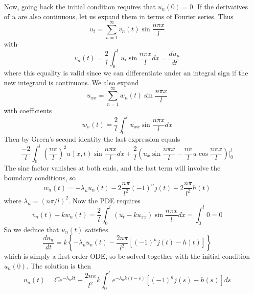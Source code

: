 \documentclass[12pt, a4paper, oneside, openright, titlepage]{book}
\begin{document}
Now, going back the initial condition requires that $u_n(0) = 0$. If the derivatives of $u$ are also continuous, let us expand them in terms of Fourier series. Thus \begin{equation*}
    u_t = \sum_{n=1}^{\infty}v_n(t)\sin\frac{n\pi x}{l}
\end{equation*}
with \begin{equation*}
    v_n(t) = \frac{2}{l}\int_0^lu_t\sin\frac{n\pi x}{l}dx = \frac{du_n}{dt}
\end{equation*}
where this equality is valid since we can differentiate under an integral sign if the new integrand is continuous. We also expand \begin{equation*}
    u_{xx} = \sum_{n=1}^{\infty}w_n(t)\sin\frac{n\pi x}{l}
\end{equation*}
with coefficients \begin{equation*}
    w_n(t) = \frac{2}{l}\int_0^lu_{xx}\sin\frac{n\pi x}{l}dx
\end{equation*}
Then by Green's second identity the last expression equals \begin{equation*}
    \frac{-2}{l}\int_0^l\left(\frac{n\pi}{l}\right)^2u(x,t)\sin\frac{n\pi x}{l}dx + \frac{2}{l}\left(u_x\sin\frac{n\pi x}{l} - \frac{n\pi}{l}u\cos\frac{n\pi x}{l}\right)\Bigg\rvert_0^l
\end{equation*}
The sine factor vanishes at both ends, and the last term will involve the boundary conditions, so \begin{equation*}
    w_n(t) = -\lambda_nu_n(t) - 2\frac{n\pi}{l^2}(-1)^nj(t) + 2\frac{n\pi}{l^2}h(t)
\end{equation*}
where $\lambda_n = (n\pi/l)^2$. Now the PDE requires \begin{equation*}
    v_n(t) - kw_n(t) = \frac{2}{l}\int_0^l(u_t - ku_{xx})\sin\frac{n\pi x}{l}dx = \int_0^l0 = 0
\end{equation*}
So we deduce that $u_n(t)$ satisfies \begin{equation*}
    \frac{du_n}{dt} = k\left\{-\lambda_nu_n(t) - \frac{2n\pi}{l^2}\left[(-1)^nj(t) - h(t)\right]\right\}
\end{equation*}
which is simply a first order ODE, so be solved together with the initial condition $u_n(0)$. The solution is then \begin{equation}
    \boxed{u_n(t) = Ce^{-\lambda_nkt} - \frac{2n\pi}{l^2}k\int_0^te^{-\lambda_nk(t-s)}\left[(-1)^nj(s)-h(s)\right]ds}
\end{equation}
\end{document}
